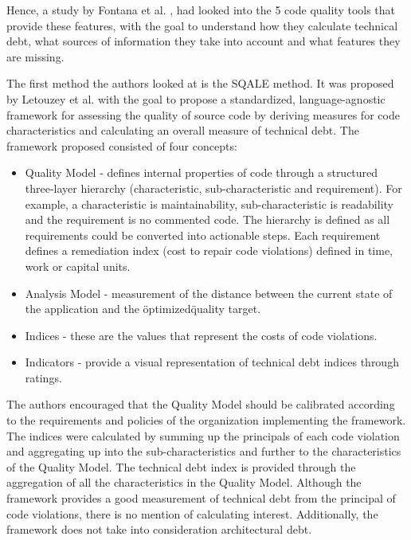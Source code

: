 \documentclass{mprop}
\begin{document}
Hence, a study by Fontana et al. \cite{Fontana2016}, had looked into the 5 code
quality tools that provide these features, with the goal to understand how they
calculate technical debt, what sources of information they take into account and
what features they are missing. 

The first method the authors looked at is the SQALE method. It was proposed by
Letouzey et al. \cite{Letouzey2012} with the goal to propose a standardized,
language-agnostic framework for assessing the quality of source code by deriving
measures for code characteristics and calculating an overall measure of
technical debt. The framework proposed consisted of four concepts:
\begin{itemize}
	\item Quality Model - defines internal properties of code through a
	structured three-layer hierarchy (characteristic, sub-characteristic and
	requirement). For example, a characteristic is maintainability,
	sub-characteristic is readability and the requirement is no commented
	code. The hierarchy is defined as all requirements could be converted into
	actionable steps. Each requirement defines a remediation index (cost to
	repair code violations) defined in time, work or capital units.
	\item Analysis Model - measurement of the distance between the current
	state of the application and the \"optimized\" quality target.
	\item Indices - these are the values that represent the costs of code
	violations.
	\item Indicators - provide a visual representation of technical debt indices
	through ratings.
\end{itemize}
The authors encouraged that the Quality Model should be calibrated according to
the requirements and policies of the organization implementing the framework.
The indices were calculated by summing up the principals of each code violation
and aggregating up into the sub-characteristics and further to the
characteristics of the Quality Model. The technical debt index is provided
through the aggregation of all the characteristics in the Quality Model.
Although the framework provides a good measurement of technical debt from the
principal of code violations, there is no mention of calculating interest.
Additionally, the framework does not take into consideration architectural debt.
\end{document}
